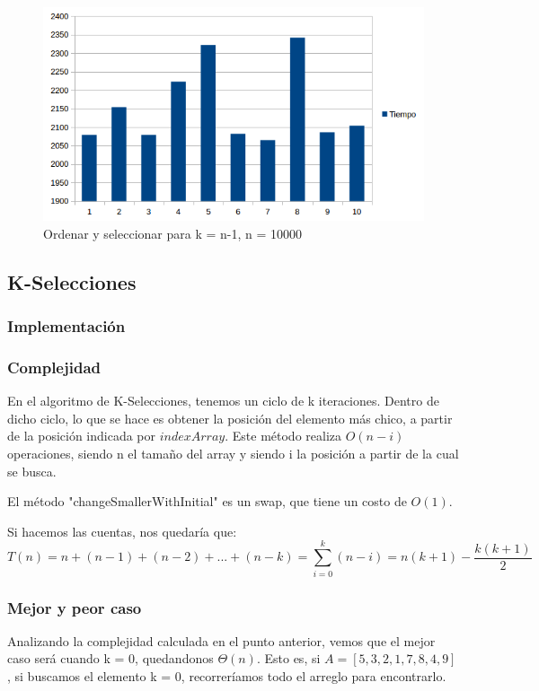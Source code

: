 \begin{figure}[H]
\centering
\includegraphics[width=\textwidth]{KN/OrderAndSelectN.png}
\caption{Ordenar y seleccionar para k = n-1, n = 10000}
\end{figure}

\newpage
\subsection{K-Selecciones}
\subsubsection{Implementación}

\subsubsection{Complejidad}
En el algoritmo de K-Selecciones, tenemos un ciclo de k iteraciones. Dentro de dicho ciclo, lo que se hace es obtener la posición del elemento más chico, a partir de la posición indicada por $indexArray$. Este método realiza $O(n-i)$ operaciones, siendo n el tamaño del array y siendo i la posición a partir de la cual se busca.

El método "changeSmallerWithInitial" es un swap, que tiene un costo de $O(1)$.

Si hacemos las cuentas, nos quedaría que:
$$T(n) = n + (n-1) + (n-2) + ... + (n-k) = \sum_{i=0}^{k} (n - i) = n(k+1) - \frac{k (k+1)}{2}$$
\subsubsection{Mejor y peor caso}
Analizando la complejidad calculada en el punto anterior, vemos que el mejor caso será cuando k = 0, quedandonos $\Theta(n)$. Esto es, si $A = [ 5, 3, 2, 1, 7, 8, 4, 9]$, si buscamos el elemento k = 0, recorreríamos todo el arreglo para encontrarlo.

